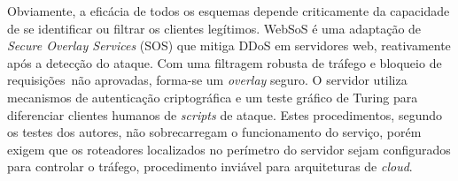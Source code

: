 Obviamente, a eficácia de todos os esquemas depende criticamente da capacidade de se identificar ou filtrar os clientes legítimos. 
%
WebSoS \cite{Stavrou:2005:WOS:1090583.1648614} é uma adaptação de \emph{Secure Overlay Services} (SOS) \cite{Keromytis:2002:SSO:964725.633032} que mitiga DDoS em servidores web, reativamente após a detecção do ataque. Com uma filtragem robusta de tráfego e bloqueio de requisições~não aprovadas, forma-se um \emph{overlay} seguro. O servidor utiliza mecanismos de autenticação criptográfica e um teste gráfico de Turing \cite{Dietrich00analyzingdistributed} para diferenciar clientes humanos de \emph{scripts} de ataque. Estes procedimentos, segundo os testes dos autores, não sobrecarregam o funcionamento do serviço, porém exigem que os roteadores localizados no perímetro do servidor sejam configurados para controlar o tráfego, procedimento inviável para arquiteturas de \emph{cloud}.
